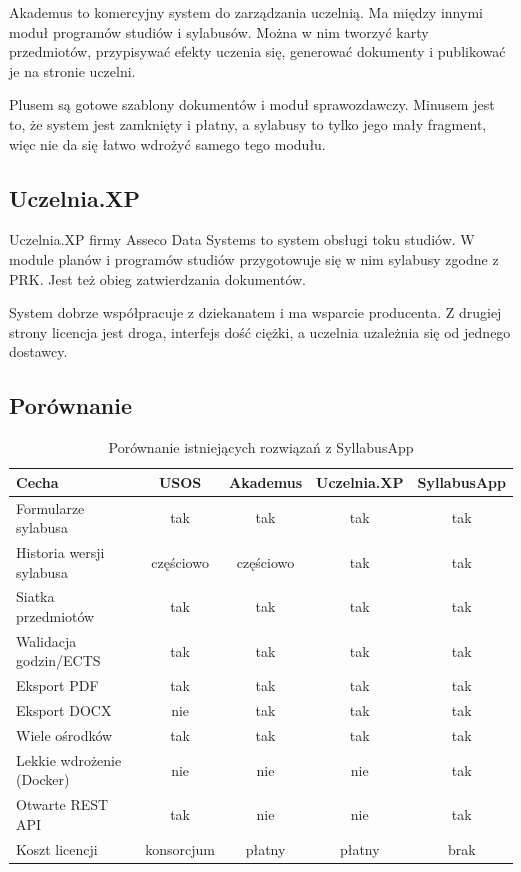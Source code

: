 \documentclass[times]{san}
\begin{document}
Akademus \cite{akademus} to komercyjny system do zarządzania uczelnią. Ma między innymi moduł programów studiów i sylabusów. Można w nim tworzyć karty przedmiotów, przypisywać efekty uczenia się, generować dokumenty i publikować je na stronie uczelni.

Plusem są gotowe szablony dokumentów i moduł sprawozdawczy. Minusem jest to, że system jest zamknięty i płatny, a sylabusy to tylko jego mały fragment, więc nie da się łatwo wdrożyć samego tego modułu.

\subsection{Uczelnia.XP}

Uczelnia.XP \cite{uczelniaxp} firmy Asseco Data Systems to system obsługi toku studiów. W module planów i programów studiów przygotowuje się w nim sylabusy zgodne z PRK. Jest też obieg zatwierdzania dokumentów.

System dobrze współpracuje z dziekanatem i ma wsparcie producenta. Z drugiej strony licencja jest droga, interfejs dość ciężki, a uczelnia uzależnia się od jednego dostawcy.

\subsection{Porównanie}

\begin{table}[H]
\centering
\caption{Porównanie istniejących rozwiązań z SyllabusApp}
\label{tab:porownanie}
\small
\begin{tabularx}{\textwidth}{|X|c|c|c|c|}
\hline
\textbf{Cecha} & \textbf{USOS} & \textbf{Akademus} & \textbf{Uczelnia.XP} & \textbf{SyllabusApp} \\
\hline
Formularze sylabusa & tak & tak & tak & tak \\
Historia wersji sylabusa & częściowo & częściowo & tak & tak \\
Siatka przedmiotów & tak & tak & tak & tak \\
Walidacja godzin/ECTS & tak & tak & tak & tak \\
Eksport PDF & tak & tak & tak & tak \\
Eksport DOCX & nie & tak & tak & tak \\
Wiele ośrodków & tak & tak & tak & tak \\
Lekkie wdrożenie (Docker) & nie & nie & nie & tak \\
Otwarte REST API & tak & nie & nie & tak \\
Koszt licencji & konsorcjum & płatny & płatny & brak \\
\hline
\end{tabularx}
\end{table}
\end{document}
